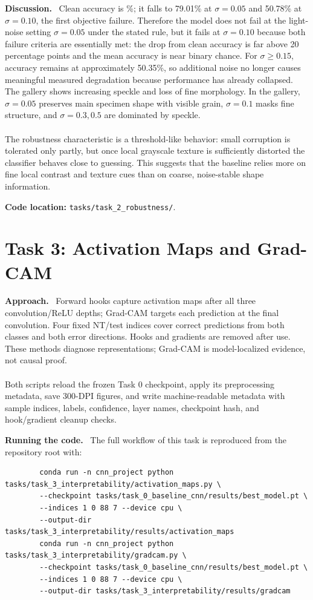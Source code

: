 \documentclass[10pt,a4paper]{article}
\newcommand{\TaskPage}[2]{%
  \clearpage
  \section{Task #1: #2}\label{task:#1:start}%
}
\newcommand{\TaskEnd}[1]{\label{task:#1:end}}
\newcommand{\RunHead}[1]{\par\smallskip\noindent\textbf{#1.}\ }
\newcommand{\CodePath}[1]{%
  \par\smallskip\noindent\textbf{Code location: }\nolinkurl{#1}.%
}
\begin{document}
\RunHead{Discussion}
Clean accuracy is \TaskTwoCleanAccuracy\%; it falls to 79.01\% at
$\sigma=0.05$ and 50.78\% at $\sigma=0.10$, the first objective failure. Therefore the model
does not fail at the light-noise setting $\sigma=0.05$ under the stated rule, but it fails at
$\sigma=0.10$ because both failure criteria are essentially met: the drop from clean accuracy
is far above 20 percentage points and the mean accuracy is near binary chance. For
$\sigma\geq0.15$, accuracy remains at approximately 50.35\%, so additional noise no longer
causes meaningful measured degradation because performance has already collapsed.
The gallery shows increasing speckle and loss of fine morphology. In the gallery, \(\sigma=0.05\) preserves main
specimen shape with visible grain, \(\sigma=0.1\) masks fine structure, and
\(\sigma=0.3,0.5\) are dominated by speckle.
\\ \\
The robustness characteristic is a threshold-like behavior: small corruption is tolerated only
partly, but once local grayscale texture is sufficiently distorted the classifier behaves close
to guessing. This suggests that the baseline relies more on fine local contrast and texture
cues than on coarse, noise-stable shape information.

\CodePath{tasks/task_2_robustness/}
\TaskEnd{2}

\TaskPage{3}{Activation Maps and Grad-CAM}

\RunHead{Approach}
Forward hooks capture activation maps after all three convolution/ReLU depths; Grad-CAM
targets each prediction at the final convolution. Four fixed NT/test indices cover correct
predictions from both classes and both error directions. Hooks and gradients are removed after
use. These methods diagnose representations; Grad-CAM is model-localized evidence, not causal
proof.
\\ \\
Both scripts reload the frozen Task 0 checkpoint, apply its preprocessing metadata, save
300-DPI figures, and write machine-readable metadata with sample indices, labels, confidence,
layer names, checkpoint hash, and hook/gradient cleanup checks.

\RunHead{Running the code}
The full workflow of this task is reproduced from the repository root with:
\begin{small}
	\begin{verbatim}
		conda run -n cnn_project python tasks/task_3_interpretability/activation_maps.py \
		--checkpoint tasks/task_0_baseline_cnn/results/best_model.pt \
		--indices 1 0 88 7 --device cpu \
		--output-dir tasks/task_3_interpretability/results/activation_maps
		conda run -n cnn_project python tasks/task_3_interpretability/gradcam.py \
		--checkpoint tasks/task_0_baseline_cnn/results/best_model.pt \
		--indices 1 0 88 7 --device cpu \
		--output-dir tasks/task_3_interpretability/results/gradcam
	\end{verbatim}
\end{small}
\end{document}
